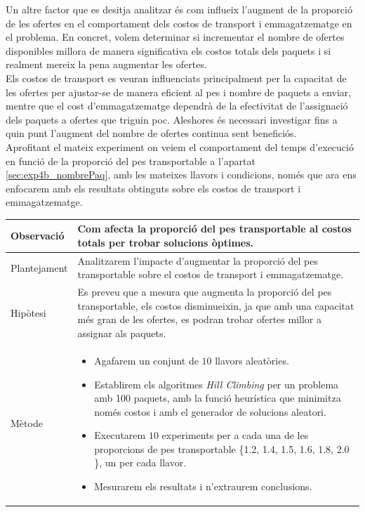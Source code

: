 \documentclass[a4paper]{article}
\begin{document}
	Un altre factor que es desitja analitzar és com influeix l'augment de la proporció de les ofertes en el comportament dels costos de transport i emmagatzematge en el problema. En concret, volem determinar si incrementar el nombre de ofertes disponibles millora de manera significativa els costos totals dels paquets i si realment mereix la pena augmentar les ofertes. \\
	
	Els costos de transport es veuran influenciats principalment per la capacitat de les ofertes per ajustar-se de manera eficient al pes i nombre de paquets a enviar, mentre que el cost d'emmagatzematge dependrà de la efectivitat de l'assignació dels paquets a ofertes que triguin poc. Aleshores és necessari investigar fins a quin punt l'augment del nombre de ofertes continua sent beneficiós. \\
	
	Aprofitant el mateix experiment on veiem el comportament del temps d'execució en funció de la proporció del pes transportable a l'apartat \ref{sec:exp4b_nombrePaq}, amb les mateixes llavors i condicions, només que ara ens enfocarem amb els resultats obtinguts sobre els costos de transport i emmagatzematge.
	
	\begin{table}[ht]
		\centering
		\begin{tabular}{|l|p{10cm}|}
			\hline
			Observació & Com afecta la proporció del pes transportable al costos totals per trobar solucions òptimes.\\
			\hline
			Plantejament & Analitzarem l'impacte d'augmentar la proporció del pes transportable sobre el costos de transport i emmagatzematge. \\
			\hline
			Hipòtesi & Es preveu que a mesura que augmenta la proporció del pes transportable, els costos disminueixin, ja que amb una capacitat més gran de les ofertes, es podran trobar ofertes millor a assignar als paquets.\\
			\hline
			Mètode &
			\begin{itemize}
				\item Agafarem un conjunt de $10$ llavors aleatòries.
				\item Establirem els algoritmes \textit{Hill Climbing} per un problema amb 100 paquets, amb la funció heurística que minimitza només costos i amb el generador de solucions aleatori.
				\item Executarem $10$ experiments per a cada una de les proporcions de pes transportable \{1.2, 1.4, 1.5, 1.6, 1.8, 2.0 \}, un per cada llavor.
				\item Mesurarem els resultats i n'extraurem conclusions.
			\end{itemize} \\
			\hline
		\end{tabular}
		\label{tab:exp5_apartats}
	\end{table}
	
\end{document}
